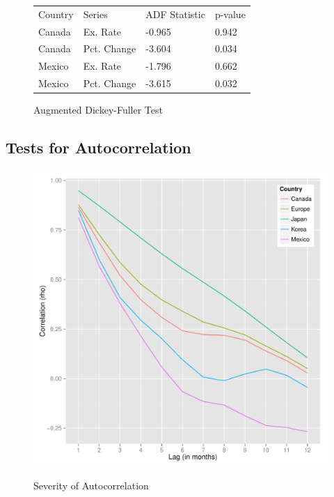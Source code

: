 \documentclass{sig-alternate-05-2015}
\begin{document}
\begin{figure}
\centering
\caption{Augmented Dickey-Fuller Test}
\begin{tabular}{l l l l}
Country & Series & ADF Statistic & p-value \\
Canada & Ex. Rate & -0.965 & 0.942 \\
Canada & Pct. Change & -3.604 & 0.034  \\
Mexico & Ex. Rate & -1.796 & 0.662 \\
Mexico & Pct. Change & -3.615 & 0.032 \\
\end{tabular}
\label{fig:adf}
\end{figure}



\subsection{Tests for Autocorrelation}

\begin{figure}
\centering
\caption{Severity of Autocorrelation}
\includegraphics[scale=0.45]{autocorrelation.pdf}
\label{fig:autocorrelation}
\end{figure}
\end{document}
